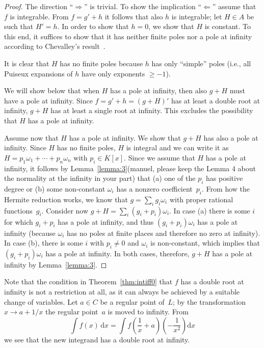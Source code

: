 \documentclass{sig-alternate}
\newcommand{\red}{\color{red}}
\begin{document}
\begin{proof}
The direction ``$\Rightarrow$'' is trivial. To show the implication
``$\Leftarrow$'' assume that $f$ is integrable. From $f=g'+h$ it follows that
also $h$ is integrable; let $H\in A$ be such that $H'=h$.  In order to show
that $h=0$, we show that $H$ is constant.  To this end, it suffices to show that
it has neither finite poles nor a pole at infinity according to Chevalley's result~\cite[page 9, Corollary 3 ]{Chevalley1951}.

It is clear that $H$ has no finite poles because $h$ has only ``simple'' poles (i.e., all Puiseux
expansions of $h$ have only exponents $\geq-1$).

We will show below that when $H$ has a pole at infinity, then also $g+H$ must
have a pole at infinity.  Since $f=g'+h=(g+H)'$ has at least a double root at
infinity, $g+H$ has at least a single root at infinity. This excludes the
possibility that $H$ has a pole at infinity.

Assume now that $H$ has a pole at infinity. We show that $g+H$ has also a pole at infinity.
Since $H$ has no finite poles, $H$ is integral and we can write it as
$H=p_1\omega_1+\cdots+p_n\omega_n$ with $p_i\in K[x]$.
Since we assume that $H$ has a pole at infinity, it follows by Lemma~\ref{lemma:3}{\red (manuel, please keep the
Lemma 4 about the normality at the infinity in your part)} that
(a) one of the $p_i$ has positive degree or
(b) some non-constant $\omega_i$ has a nonzero coefficient~$p_i$.
From how the Hermite reduction works, we know that $g=\sum_i g_i\omega_i$
with proper rational functions~$g_i$. Consider now $g+H=\sum_i (g_i+p_i)\omega_i$.
In case (a) there is some $i$ for which $g_i+p_i$ has a pole at infinity,
and thus $(g_i+p_i)\omega_i$ has a pole at infinity (because $\omega_i$ has
no poles at finite places and therefore no zero at infinity).
In case (b), there is some $i$ with $p_i\neq0$ and $\omega_i$ is non-constant,
which implies that $(g_i+p_i)\omega_i$ has a pole at infinity.
In both cases, therefore, $g+H$ has a pole at infinity by Lemma~\ref{lemma:3}.
\end{proof}

Note that the condition in Theorem~\ref{thm:intiff0} that $f$ has a double
root at infinity is not a restriction at all, as it can always be achieved by
a suitable change of variables. Let $a\in C$ be a regular point of~$L$; by
the transformation $x\to a+1/x$ the regular point~$a$ is moved to
infinity. From
\[
  \int f(x) \,\mathrm{d}x = \int f\left(\frac{1}{x}+a\right)\left(-\frac{1}{x^2}\right) \mathrm{d}x
\]
we see that the new integrand has a double root at infinity.
\end{document}
